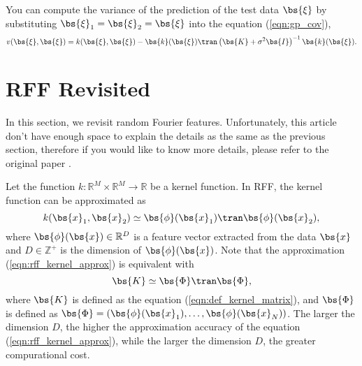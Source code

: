 \documentclass[twocolumn,a4paper,10pt]{article}
\begin{document}
You can compute the variance of the prediction of the test data $\bs{\xi}$
by substituting $\bs{\xi}_1 = \bs{\xi}_2 = \bs{\xi}$ into the equation (\ref{eqn:gp_cov}),
\begin{equation}
    v (\bs{\xi}, \bs{\xi}) = k (\bs{\xi}, \bs{\xi})
    - \bs{k} (\bs{\xi})\tran \left( \bs{K} + \sigma^2 \bs{I} \right)^{-1} \bs{k} (\bs{\xi}).
\end{equation}


\section{RFF Revisited}\titlebar

In this section, we revisit random Fourier features. Unfortunately, this article don't have
enough space to explain the details as the same as the previous section, therefore if you
would like to know more details, please refer to the original paper \cite{Rahimi2007}.

Let the function $k: \mathbb{R}^M \times \mathbb{R}^M \to \mathbb{R}$ be a kernel function.
In RFF, the kernel function can be approximated as
\begin{equation}
    k (\bs{x}_1, \bs{x}_2) \simeq \bs{\phi}(\bs{x}_1)\tran \bs{\phi}(\bs{x}_2),
    \label{eqn:rff_kernel_approx}
\end{equation}
where $\bs{\phi}(\bs{x}) \in \mathbb{R}^D$ is a feature vector extracted from 
the data $\bs{x}$ and $D \in \mathbb{Z}^+$ is the dimension of $\bs{\phi}(\bs{x})$.
Note that the approximation (\ref{eqn:rff_kernel_approx}) is equivalent with
\begin{equation}
    \bs{K} \simeq \bs{\Phi}\tran \bs{\Phi},
    \label{eqn:rff_kernel_approx_matrix}
\end{equation}
where $\bs{K}$ is defined as the equation (\ref{eqn:def_kernel_matrix}), and $\bs{\Phi}$ is defined
as $\bs{\Phi} = (\bs{\phi} (\bs{x}_1), \ldots, \bs{\phi} (\bs{x}_N))$.
The larger the dimension $D$, the higher the approximation accuracy of the equation
(\ref{eqn:rff_kernel_approx}), while the larger the dimension $D$, the greater compurational cost.
\end{document}
